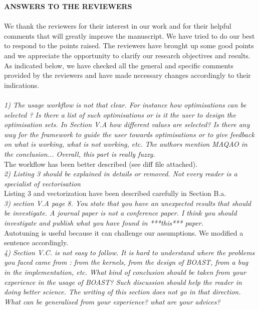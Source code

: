 \documentclass[10pt]{article}
\begin{document}
\noindent
{\Large\bf ANSWERS TO THE REVIEWERS}\\~\\

We thank the  reviewers for their interest in our work and for their helpful comments that will greatly improve  the manuscript. We have  tried  to do  our  best to  respond to  the  points  raised. The reviewers have brought  up  some  good  points  and  we  appreciate  the  opportunity  to  clarify  our research objectives and results. As  indicated  below,  we  have  checked  all  the  general  and  specific  comments  provided  by  the reviewers and have made necessary changes accordingly to their indications.\\

\\

\noindent
{\em 1) The usage workflow is not that clear. For instance how optimisations can be selected ? Is there a list of such optimisations or is it the user
  to design the optimisation sets. In Section V.A how different values are selected? Is there any way for the framework to guide the user towards
  optimisations or to give feedback on what is working, what is not working, etc. The authors mention MAQAO in the conclusion... Overall, this part is
  really fuzzy.}\\

The workflow has been better described (see diff file attached).\\

\noindent
{\em 2) Listing 3 should be explained in details or removed. Not every reader is a specialist of vectorisation}\\

Listing 3 and vectorization have been described carefully in Section B.a.\\

\noindent
{\em 3) section V.A page 8. You state that you have an unexpected results that should be investigate. A journal paper is not a conference paper. I
  think you should investigate and publish what you have found in ***this*** paper.} \\

Autotuning is useful because it can challenge our assumptions. We modified a sentence accordingly. \\

\noindent
{\em 4) Section V.C. is not easy to follow. It is hard to understand where the problems you faced came from : from the kernels, from the design of BOAST, from a bug in the implementation, etc. What kind of conclusion should be taken from your experience in the usage of BOAST? Such discussion should help the reader in doing better science. The writing of this section does not go in that direction. What can be generalised from your experience? what are your advices?}\\
\end{document}
